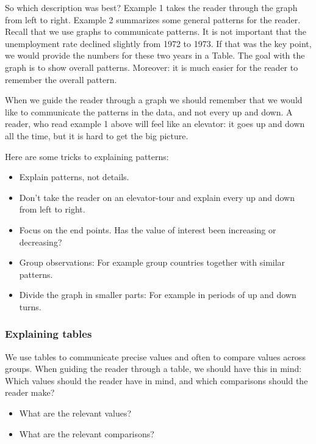 \documentclass[]{book}
\providecommand{\tightlist}{%
  \setlength{\itemsep}{0pt}\setlength{\parskip}{0pt}}
\begin{document}
So which description was best? Example 1 takes the reader through the graph from left to right. Example 2 summarizes some general patterns for the reader. Recall that we use graphs to communicate patterns. It is not important that the unemployment rate declined slightly from 1972 to 1973. If that was the key point, we would provide the numbers for these two years in a Table. The goal with the graph is to show overall patterns. Moreover: it is much easier for the reader to remember the overall pattern.

When we guide the reader through a graph we should remember that we would like to communicate the patterns in the data, and not every up and down. A reader, who read example 1 above will feel like an elevator: it goes up and down all the time, but it is hard to get the big picture.

Here are some tricks to explaining patterns:

\begin{itemize}
\tightlist
\item
  Explain patterns, not details.
\item
  Don't take the reader on an elevator-tour and explain every up and down from left to right.
\item
  Focus on the end points. Has the value of interest been increasing or decreasing?
\item
  Group observations: For example group countries together with similar patterns.
\item
  Divide the graph in smaller parts: For example in periods of up and down turns.
\end{itemize}

\hypertarget{explaining-tables}{%
\subsubsection*{Explaining tables}\label{explaining-tables}}

We use tables to communicate precise values and often to compare values across groups. When guiding the reader through a table, we should have this in mind: Which values should the reader have in mind, and which comparisons should the reader make?

\begin{itemize}
\tightlist
\item
  What are the relevant values?
\item
  What are the relevant comparisons?
\end{itemize}
\end{document}
